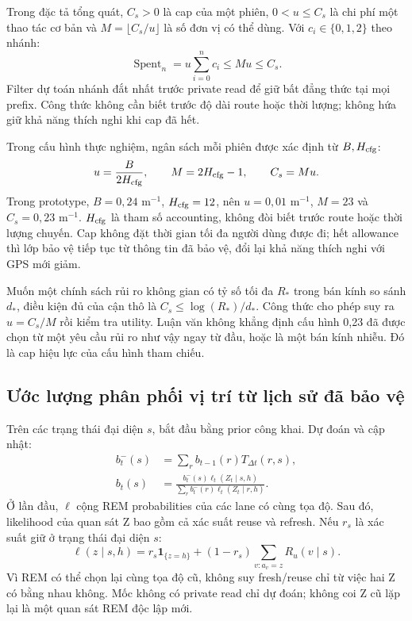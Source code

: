 Trong đặc tả tổng quát, $C_s>0$ là cap của một phiên, $0<u\le C_s$ là chi phí một thao tác cơ bản và
$M=\lfloor C_s/u\rfloor$ là số đơn vị có thể dùng. Với $c_i\in\{0,1,2\}$ theo nhánh:
\begin{equation}
\operatorname{Spent}_n=u\sum_{i=0}^{n}c_i\le Mu\le C_s.
\label{eq:budget-general}
\end{equation}
Filter dự toán nhánh đắt nhất trước private read để giữ bất đẳng thức tại mọi prefix. Công thức
không cần biết trước độ dài route hoặc thời lượng; không hứa giữ khả năng thích nghi khi cap đã hết.

Trong cấu hình thực nghiệm, ngân sách mỗi phiên được xác định từ $B,H_{\rm cfg}$:
\begin{equation}
u=\frac{B}{2H_{\rm cfg}},\qquad M=2H_{\rm cfg}-1,\qquad C_s=Mu.
\label{eq:budget-config}
\end{equation}
Trong prototype, $B=0{,}24$ m$^{-1}$, $H_{\rm cfg}=12$, nên $u=0{,}01$ m$^{-1}$, $M=23$ và
$C_s=0{,}23$ m$^{-1}$. $H_{\rm cfg}$ là tham số accounting, không đòi biết trước route hoặc thời
lượng chuyến. Cap không đặt thời gian tối đa người dùng được đi; hết allowance thì lớp bảo vệ tiếp
tục từ thông tin đã bảo vệ, đổi lại khả năng thích nghi với GPS mới giảm.

Muốn một chính sách rủi ro không gian có tỷ số tối đa $R_*$ trong bán kính so sánh $d_*$, điều kiện đủ
của cận thô là $C_s\le\log(R_*)/d_*$. Công thức cho phép suy ra $u=C_s/M$ rồi kiểm tra utility.
Luận văn không khẳng định cấu hình 0,23 đã được chọn từ một yêu cầu rủi ro như vậy ngay từ đầu, hoặc
là một bán kính nhiễu. Đó là cap hiệu lực của cấu hình tham chiếu.

\subsection{Ước lượng phân phối vị trí từ lịch sử đã bảo vệ}
Trên các trạng thái đại diện $s$, bắt đầu bằng prior công khai. Dự đoán và cập nhật:
\begin{align}
b_t^-(s)&=\sum_r b_{t-1}(r)T_{\Delta t}(r,s),\label{eq:belief-prediction}\\
b_t(s)&=\frac{b_t^-(s)\ell_t(Z_t\mid s,h)}{\sum_r b_t^-(r)\ell_t(Z_t\mid r,h)}.\label{eq:belief}
\end{align}
Ở lần đầu, $\ell$ cộng REM probabilities của các lane có cùng tọa độ. Sau đó, likelihood của quan
sát Z bao gồm cả xác suất reuse và refresh. Nếu $r_s$ là xác suất giữ ở trạng thái đại diện $s$:
\begin{equation}
\ell(z\mid s,h)=r_s\mathbf1_{\{z=h\}}+(1-r_s)\sum_{v:a_v=z}R_u(v\mid s).
\label{eq:emission}
\end{equation}
Vì REM có thể chọn lại cùng tọa độ cũ, không suy fresh/reuse chỉ từ việc hai Z có bằng nhau không.
Mốc không có private read chỉ dự đoán; không coi Z cũ lặp lại là một quan sát REM độc lập mới.

